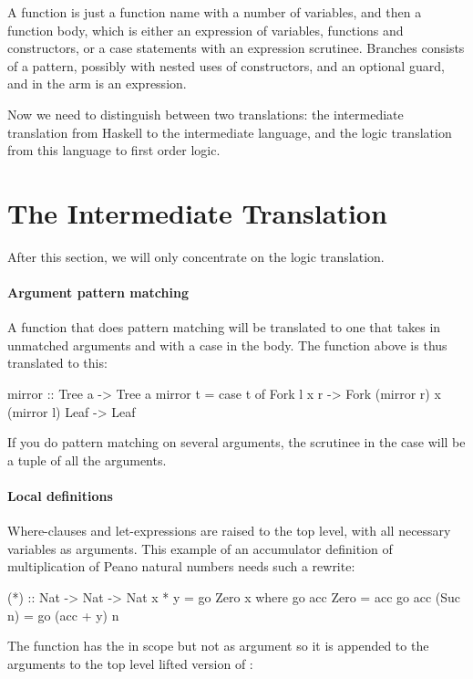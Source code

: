 A function is just a function name with a number of variables, and
then a function body, which is either an expression of variables,
functions and constructors, or a case statements with an expression
scrutinee. Branches consists of a pattern, possibly with nested uses
of constructors, and an optional guard, and in the arm is an
expression.

Now we need to distinguish between two translations: the intermediate
translation from Haskell to the intermediate language, and the logic
translation from this language to first order logic.

\section{The Intermediate Translation}

After this section, we will only concentrate on the logic translation.

\paragraph{Argument pattern matching} A function that does pattern matching will be translated to one that
takes in unmatched arguments and with a case in the body. The
 function above is thus translated to this:

\begin{code}
mirror :: Tree a -> Tree a
mirror t = case t of
   Fork l x r -> Fork (mirror r) x (mirror l)
   Leaf       -> Leaf
\end{code}

\noindent
If you do pattern matching on several arguments, the scrutinee in the
case will be a tuple of all the arguments.

\paragraph{Local definitions} Where-clauses and let-expressions are
raised to the top level, with all necessary variables as
arguments. This example of an accumulator definition of multiplication
of Peano natural numbers needs such a rewrite:

\begin{code}
(*) :: Nat -> Nat -> Nat
x * y = go Zero x
  where
    go acc Zero    = acc
    go acc (Suc n) = go (acc + y) n
\end{code}

\noindent
The  function has the  in scope but not as argument so it
is appended to the arguments to the top level lifted version of :

